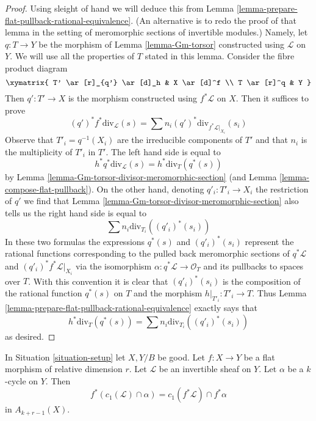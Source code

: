 \begin{proof}
Using sleight of hand we will deduce this from
Lemma \ref{lemma-prepare-flat-pullback-rational-equivalence}.
(An alternative is to redo the proof of that lemma in the
setting of meromorphic sections of invertible modules.)
Namely, let $q : T \to Y$ be the morphism of
Lemma \ref{lemma-Gm-torsor} constructed using $\mathcal{L}$ on $Y$.
We will use all the properties of $T$ stated in this lemma.
Consider the fibre product diagram
$$
\xymatrix{
T' \ar[r]_{q'} \ar[d]_h & X \ar[d]^f \\
T \ar[r]^q & Y
}
$$
Then $q' : T' \to X$ is the morphism constructed using $f^*\mathcal{L}$
on $X$. Then it suffices to prove
$$
(q')^*f^*\text{div}_\mathcal{L}(s) =
\sum n_i (q')^*\text{div}_{f^*\mathcal{L}|_{X_i}}(s_i)
$$
Observe that $T'_i = q^{-1}(X_i)$ are the irreducible components of $T'$
and that $n_i$ is the multiplicity of $T'_i$ in $T'$.
The left hand side is equal to
$$
h^*q^*\text{div}_\mathcal{L}(s) = h^*\text{div}_T(q^*(s))
$$
by Lemma \ref{lemma-Gm-torsor-divisor-meromorphic-section}
(and Lemma \ref{lemma-compose-flat-pullback}).
On the other hand, denoting $q'_i : T'_i \to X_i$
the restriction of $q'$ we find that
Lemma \ref{lemma-Gm-torsor-divisor-meromorphic-section}
also tells us the right hand side is equal to
$$
\sum n_i \text{div}_{T_i}((q'_i)^*(s_i))
$$
In these two formulas the expressions $q^*(s)$ and $(q'_i)^*(s_i)$
represent the rational functions corresponding to the pulled back
meromorphic sections of $q^*\mathcal{L}$ and $(q'_i)^*f^*\mathcal{L}|_{X_i}$
via the isomorphism $\alpha : q^*\mathcal{L} \to \mathcal{O}_T$
and its pullbacks to spaces over $T$. With this convention it is
clear that $(q'_i)^*(s_i)$ is the composition of the rational function
$q^*(s)$ on $T$ and the morphism $h|_{T'_i} : T'_i \to T$.
Thus Lemma \ref{lemma-prepare-flat-pullback-rational-equivalence}
exactly says that
$$
h^*\text{div}_T(q^*(s)) = \sum n_i \text{div}_{T_i}((q'_i)^*(s_i))
$$
as desired.
\end{proof}

\begin{lemma}
\label{lemma-flat-pullback-cap-c1}
In Situation \ref{situation-setup} let $X, Y/B$ be good.
Let $f : X \to Y$ be a flat morphism of relative dimension $r$.
Let $\mathcal{L}$ be an invertible sheaf on $Y$.
Let $\alpha$ be a $k$-cycle on $Y$.
Then
$$
f^*(c_1(\mathcal{L}) \cap \alpha) = c_1(f^*\mathcal{L}) \cap f^*\alpha
$$
in $A_{k + r - 1}(X)$.
\end{lemma}


